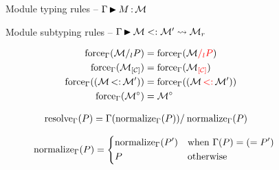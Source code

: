\documentclass{article}
\theoremstyle{definition}
\begin{document}
\begin{figure}[!p]
  \vspace{-3mm}
  \caption{Module typing rules -- $\Gamma \operatorname{\blacktriangleright}_{} M \operatorname{:} \mathcal M$}
  \label{module:typing}

  \vspace{-3mm}
  \caption{Module subtyping rules -- $\Gamma \operatorname{\blacktriangleright}_{} \mathcal M <: \mathcal M' \leadsto \mathcal M_r$}
  \label{module:subtyping}
\end{figure}

\begin{figure}[hbt]
  \vspace{-3mm}
  \caption{Lookup rules -- $\lookup{\E}{\ip} = \iM$}
  \label{module:lookup}

  \begin{subfigure}[t]{0.3\linewidth}
    \begin{align*}
      \operatorname{force}_{\Gamma}(\mathcal M/_{l}P)
      &= \operatorname{force}_{\Gamma}(\mathcal M{\color{red}/_{l}P})\\
      \operatorname{force}_{\Gamma}({\mathcal M}_{\color{black}\left[\mathcal C\right]})
      &= \operatorname{force}_{\Gamma}({\mathcal M}_{\color{red}\left[\mathcal C\right]})\\
      \operatorname{force}_{\Gamma}((\mathcal M \operatorname{<:} \mathcal M'))
      &= \operatorname{force}_{\Gamma}((\mathcal M \operatorname{{\color{red}<:}} \mathcal M'))\\
      \operatorname{force}_{\Gamma}({\mathcal M^\circ}) &= {\mathcal M^\circ}
    \end{align*}
  \end{subfigure}
  \begin{subfigure}[t]{0.33\linewidth}
    \begin{align*}
      \operatorname{resolve}_{\Gamma}(P)
      &= \Gamma(\operatorname{normalize}_{\Gamma}(P))/_{}\operatorname{normalize}_{\Gamma}(P)
    \end{align*}
  \end{subfigure}
  \begin{subfigure}[t]{0.33\linewidth}
    \begin{align*}
      \operatorname{normalize}_{\Gamma}(P)
      &=
        \begin{dcases}
          \operatorname{normalize}_{\Gamma}(P') & \text{when } \Gamma(P) = (= P') \\
          P & \text{otherwise}
        \end{dcases}
    \end{align*}
  \end{subfigure}

\end{figure}
\end{document}
